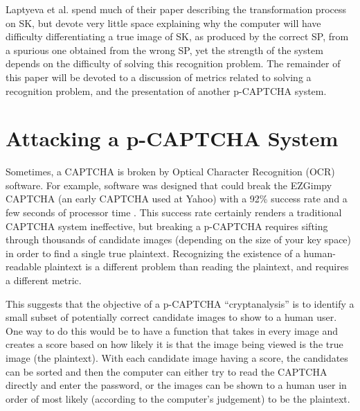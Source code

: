 \documentclass[12pt]{article}
\begin{document}
Laptyeva et al. spend much of their paper describing the transformation process on SK, but devote very little space explaining why the computer will have difficulty differentiating a true image of SK, as produced by the correct SP, from a spurious one obtained from the wrong SP, yet the strength of the system depends on the difficulty of solving this recognition problem. The remainder of this paper will be devoted to a discussion of metrics related to solving a recognition problem, and the presentation of another p-CAPTCHA system.

\section*{Attacking a p-CAPTCHA System}
Sometimes, a CAPTCHA is broken by Optical Character Recognition (OCR) software. For example, software was designed that could break the EZGimpy CAPTCHA (an early CAPTCHA used at Yahoo) with a 92\% success rate and a few seconds of processor time \cite{mori}. This success rate certainly renders a traditional CAPTCHA system ineffective, but breaking a p-CAPTCHA requires sifting through thousands of candidate images (depending on the size of your key space) in order to find a single true plaintext. Recognizing the existence of a human-readable plaintext is a different problem than reading the plaintext, and requires a different metric.

This suggests that the objective of a p-CAPTCHA “cryptanalysis” is to identify a small subset of potentially correct candidate images to show to a human user. One way to do this would be to have a function that takes in every image and creates a score based on how likely it is that the image being viewed is the true image (the plaintext). With each candidate image having a score, the candidates can be sorted and then the computer can either try to read the CAPTCHA directly and enter the password, or the images can be shown to a human user in order of most likely (according to the computer's judgement) to be the plaintext.
\end{document}
